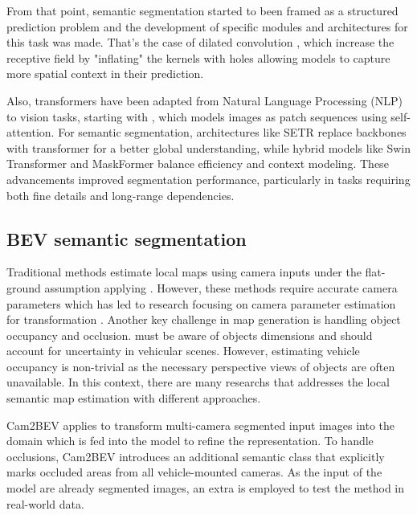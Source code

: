 {From that point, semantic segmentation started to been framed as a structured prediction problem and the development of specific modules and architectures for this task was made. That's the case of dilated convolution \cite{ditaled_conv}, which increase the receptive field by "inflating" the  kernels with holes allowing models to capture more spatial context in their prediction.

Also, transformers have been adapted from Natural Language Processing (NLP) to vision tasks, starting with  \cite{vit}, which models images as patch sequences using self-attention. For semantic segmentation, architectures like SETR \cite{SETR} replace  backbones with transformer for a better global understanding, while hybrid models like Swin Transformer \cite{swin} and MaskFormer balance efficiency and context modeling. These advancements improved segmentation performance, particularly in tasks requiring both fine details and long-range dependencies.

\subsection{BEV semantic segmentation} 
\label{sec:sota_BEV_semantic_segmentation}

Traditional methods \cite{3d_traffic_scene_understanding} estimate local  maps using camera inputs under the flat-ground assumption applying . However, these methods require accurate camera parameters which has led to research focusing on camera parameter estimation for  transformation \cite{BEV_params_estimation1} \cite{BEV_params_estimation2}. Another key challenge in  map generation is handling object occupancy and occlusion.  must be aware of objects dimensions and should account for uncertainty in vehicular scenes. However, estimating vehicle occupancy is non-trivial as the necessary perspective views of objects are often unavailable. In this context, there are many researchs that addresses the local semantic map estimation with different approaches.

Cam2BEV \cite{Cam2BEV} applies  to transform multi-camera segmented input images into the  domain which is fed into the model to refine the  representation. To handle occlusions, Cam2BEV introduces an additional semantic class that explicitly marks occluded areas from all vehicle-mounted cameras. As the input of the model are already segmented images, an extra  is employed to test the method in real-world data.  

}
